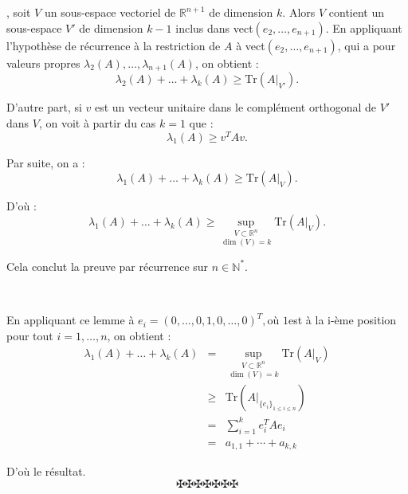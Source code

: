 , soit $V$ un sous-espace vectoriel de $\mathbb{R}^{n +
1}$ de dimension $k$. Alors $V$ contient un sous-espace $V'$ de dimension $k -
1$ inclus dans vect$(e_2, \ldots, e_{n + 1})$. En appliquant l'hypoth{\`e}se
de r{\'e}currence {\`a} la restriction de $A$ {\`a} vect$(e_2, \ldots, e_{n +
1})$, qui a pour valeurs propres $\lambda_2 (A), \ldots, \lambda_{n + 1} (A)$,
on obtient :
\[ \lambda_2 (A) + \ldots + \lambda_k (A) \geq \text{Tr} (A|_{V'}) . \]


D'autre part, si $v$ est un vecteur unitaire dans le compl{\'e}ment orthogonal
de $V'$ dans $V$, on voit {\`a} partir du cas $k = 1$ que :
\[ \lambda_1 (A) \geq v^T Av. \]


Par suite, on a :
\[ \lambda_1 (A) + \ldots + \lambda_k (A) \geq \text{Tr} (A|_V) . \]


D'o{\`u} :
\[ \lambda_1 (A) + \ldots + \lambda_k (A) \geq \underset{\dim (V) =
   k}{\underset{V \subset \mathbb{R}^n}{\sup}}  \text{Tr} (A|_V) . \]


Cela conclut la preuve par r{\'e}currence sur $n \in \mathbb{N}^{\ast}$.

\

En appliquant ce lemme {\`a} $e_i = {(0, \ldots, 0, 1, 0, \ldots, 0 )^T}
,$o{\`u} $1$est {\`a} la i-{\`e}me position pour tout $i = 1, \ldots, n$, on
obtient :
\begin{eqnarray*}
  \lambda_1 (A) + \ldots + \lambda_k (A) & = & \underset{\dim (V) =
  k}{\underset{V \subset \mathbb{R}^n}{\sup}}  \text{Tr} (A|_V)\\
  & \geqslant & \text{Tr} (A|_{\{ e_i \}_{1 \leqslant i \leqslant n}})\\
  & = & \sum_{i = 1}^k e_i^T Ae_i\\
  & = & a_{1, 1} + \cdots + a_{k, k}
\end{eqnarray*}


D'o{\`u} le r{\'e}sultat.
\[ \maltese \maltese \maltese \maltese \maltese \maltese \maltese \]

